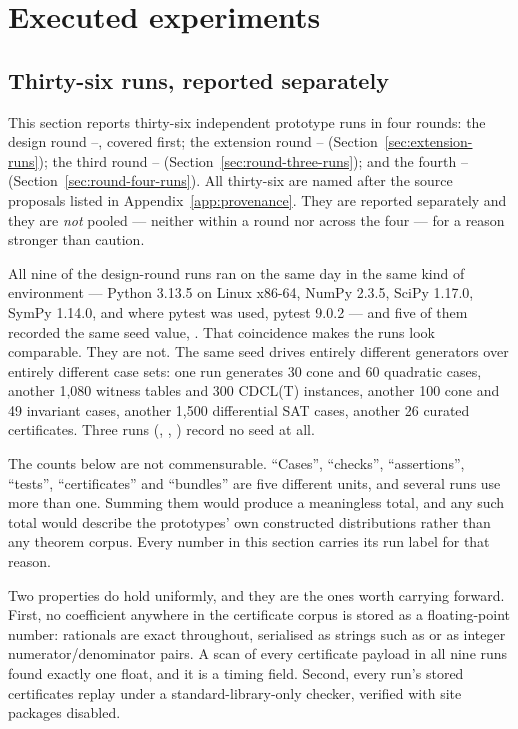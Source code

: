 \section{Executed experiments}
\label{sec:experiments}

\subsection{Thirty-six runs, reported separately}

This section reports thirty-six independent prototype runs in four rounds: the
design round --, covered first; the extension round
-- (Section~\ref{sec:extension-runs}); the third round
-- (Section~\ref{sec:round-three-runs}); and the fourth
-- (Section~\ref{sec:round-four-runs}). All thirty-six are
named after the source proposals listed in Appendix~\ref{app:provenance}. They
are reported separately and they are \emph{not} pooled --- neither within a
round nor across the four --- for a reason stronger than caution.

All nine of the design-round runs ran on the same day in the same kind of
environment --- Python 3.13.5
on Linux x86-64, NumPy 2.3.5, SciPy 1.17.0, SymPy 1.14.0, and where pytest was
used, pytest 9.0.2 --- and five of them recorded the same seed value,
. That coincidence makes the runs look comparable. They are not.
The same seed drives entirely different generators over entirely different case
sets: one run generates 30 cone and 60 quadratic cases, another 1{,}080 witness
tables and 300 CDCL(T) instances, another 100 cone and 49 invariant cases,
another 1{,}500 differential SAT cases, another 26 curated certificates. Three
runs (, , ) record no seed at all.

\begin{remark}
The counts below are not commensurable. ``Cases'', ``checks'', ``assertions'',
``tests'', ``certificates'' and ``bundles'' are five different units, and several
runs use more than one. Summing them would produce a meaningless total, and any
such total would describe the prototypes' own constructed distributions rather
than any theorem corpus. Every number in this section carries its run label for
that reason.
\end{remark}

Two properties do hold uniformly, and they are the ones worth carrying forward.
First, no coefficient anywhere in the certificate corpus is stored as a
floating-point number: rationals are exact throughout, serialised as strings
such as  or as integer numerator/denominator pairs. A scan of
every certificate payload in all nine runs found exactly one float, and it is a
timing field. Second, every run's stored certificates replay under a
standard-library-only checker, verified with site packages disabled.

